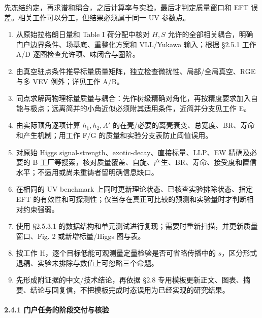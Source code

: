 \documentclass[
]{article}
\providecommand{\tightlist}{%
  \setlength{\itemsep}{0pt}\setlength{\parskip}{0pt}}
\begin{document}
先冻结约定，再求谱和耦合，之后计算率与实验，最后才判定质量窗口和 EFT
误差。相关工作可以分工，但结果必须属于同一 UV 参数点。

\begin{enumerate}
\def\labelenumi{\arabic{enumi}.}
\tightlist
\item
  从原始拉格朗日量和 Table I 荷分配中核对 \(H,S\)
  允许的全部相关耦合，明确门户边界条件、场基底、重整化方案和 VLL/Yukawa
  输入；根据 §2.5.1 工作 A/D 逐图检查允许项、味闭合与圈阶。
\item
  由真空驻点条件推导标量质量矩阵，独立检查微扰性、局部/全局真空、RGE
  与多 VEV 例外；详见工作 A/B。
\item
  同点求解两物理标量质量与耦合：先作树级精确对角化，再按精度要求加入自能与极点；远离简并的小角近似必须附其适用条件，近简并分支见工作
  E。
\item
  由实际顶角逐项计算 \(h_1,h_2,A'\)
  的在壳/必要的离壳衰变、总宽度、BR、寿命和产生机制；用工作 F/G
  的质量和实验分支表防止阈值误用。
\item
  对原始 Higgs signal-strength、exotic-decay、直接标量、LLP、EW
  精确及必要的 B
  工厂等搜索，核对质量覆盖、自旋、产生、BR、寿命、接受度和置信水平；不适用或尚未重铸者留明确信息缺口。
\item
  在相同的 UV benchmark 上同时更新理论状态、已核查实验排除状态、指定 EFT
  的有效性和可探测性；仅当存在真正可比较的预测和实验量时才判断相对约束强弱。
\item
  使用 §2.5.3.1
  的数据结构和单元测试进行复现；需要时重新扫描，并更新质量窗口、Fig. 2
  或新增标量/Higgs 图与表。
\item
  按工作 H，逐个目标低能可观测量定量检验是否可省略传播中的
  \(s\)，区分形式退耦、实验未排除与数值上可忽略三个命题。
\item
  先形成附证据的中文/技术结论，再依据 §2.8
  专用模板更新正文、图表、摘要、结论与回复信，不把模板完成时态误用为已经实现的研究结果。
\end{enumerate}

\paragraph{2.4.1
门户任务的阶段交付与核验}\label{ux95e8ux6237ux4efbux52a1ux7684ux9636ux6bb5ux4ea4ux4ed8ux4e0eux6838ux9a8c}
\end{document}
